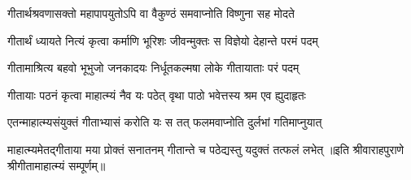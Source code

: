 \twolineshloka
{गीतार्थश्रवणासक्तो महापापयुतोऽपि वा}
{वैकुण्ठं समवाप्नोति विष्णुना सह मोदते}%

\twolineshloka
{गीतार्थं ध्यायते नित्यं कृत्वा कर्माणि भूरिशः}
{जीवन्मुक्तः स विज्ञेयो देहान्ते परमं पदम्}%

\twolineshloka
{गीतामाश्रित्य बहवो भूभुजो जनकादयः}
{निर्धूतकल्मषा लोके गीतायाताः परं पदम्}%

\twolineshloka
{गीतायाः पठनं कृत्वा माहात्म्यं नैव यः पठेत्}
{वृथा पाठो भवेत्तस्य श्रम एव ह्युदाहृतः}%

\twolineshloka
{एतन्माहात्म्यसंयुक्तं गीताभ्यासं करोति यः}
{स तत् फलमवाप्नोति दुर्लभां गतिमाप्नुयात्}%

\twolineshloka
{माहात्म्यमेतद्गीताया मया प्रोक्तं सनातनम्}
{गीतान्ते च पठेद्यस्तु यदुक्तं तत्फलं लभेत्}%
{॥इति श्रीवाराहपुराणे श्रीगीतामाहात्म्यं सम्पूर्णम्॥}
\clearpage